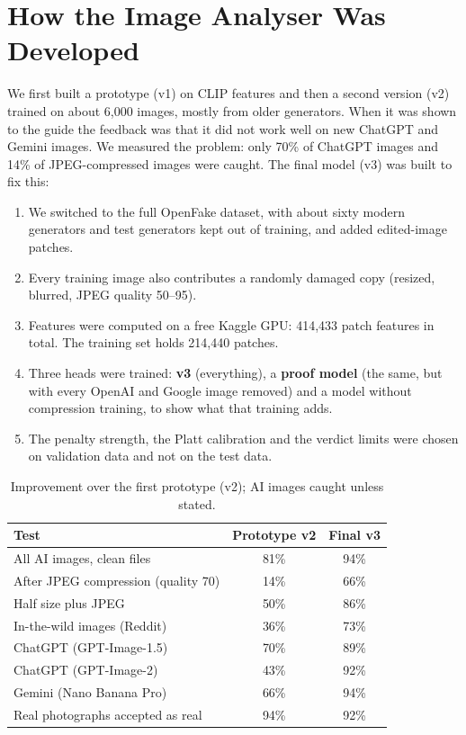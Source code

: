 \section{How the Image Analyser Was Developed}
We first built a prototype (v1) on CLIP features and then a second version (v2) trained on about 6,000 images, mostly from older generators. When it was shown to the guide the feedback was that it did not work well on new ChatGPT and Gemini images. We measured the problem: only 70\% of ChatGPT images and 14\% of JPEG-compressed images were caught. The final model (v3) was built to fix this:
\begin{enumerate}
  \item We switched to the full OpenFake dataset, with about sixty modern generators and test generators kept out of training, and added edited-image patches.
  \item Every training image also contributes a randomly damaged copy (resized, blurred, JPEG quality 50--95).
  \item Features were computed on a free Kaggle GPU: 414,433 patch features in total. The training set holds 214,440 patches.
  \item Three heads were trained: \textbf{v3} (everything), a \textbf{proof model} (the same, but with every OpenAI and Google image removed) and a model without compression training, to show what that training adds.
  \item The penalty strength, the Platt calibration and the verdict limits were chosen on validation data and not on the test data.
\end{enumerate}

\begin{table}[htbp]
\centering\small
\caption{Improvement over the first prototype (v2); AI images caught unless stated.}
\begin{tabularx}{\linewidth}{@{}X c c@{}}
\toprule
Test & Prototype v2 & Final v3\\
\midrule
All AI images, clean files & 81\% & 94\%\\
After JPEG compression (quality 70) & 14\% & 66\%\\
Half size plus JPEG & 50\% & 86\%\\
In-the-wild images (Reddit) & 36\% & 73\%\\
ChatGPT (GPT-Image-1.5) & 70\% & 89\%\\
ChatGPT (GPT-Image-2) & 43\% & 92\%\\
Gemini (Nano Banana Pro) & 66\% & 94\%\\
Real photographs accepted as real & 94\% & 92\%\\
\bottomrule
\end{tabularx}
\end{table}

